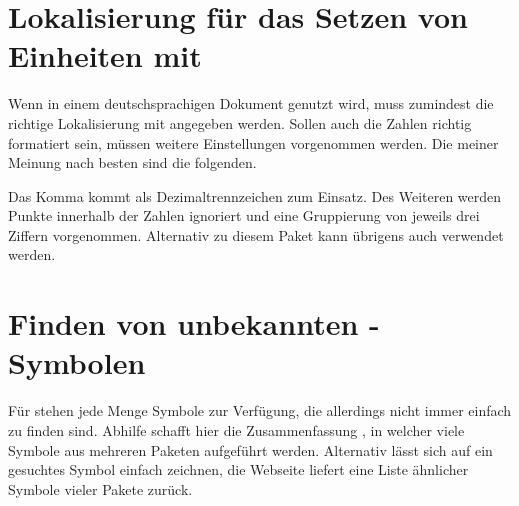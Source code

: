 \section{%
  Lokalisierung für das Setzen von Einheiten mit %
  \label{sec:tips:siunitx}%
}
%
Wenn  in einem deutschsprachigen Dokument genutzt wird, muss 
zumindest die richtige Lokalisierung mit  
angegeben werden. Sollen auch die Zahlen richtig formatiert sein, müssen 
weitere Einstellungen vorgenommen werden. Die meiner Meinung nach besten sind 
die folgenden.
%
\begin{quoting}
\begin{Code}
\end{Code}
\end{quoting}
%
Das Komma kommt als Dezimaltrennzeichen zum Einsatz. Des Weiteren werden Punkte 
innerhalb der Zahlen ignoriert und eine Gruppierung von jeweils drei Ziffern 
vorgenommen. Alternativ zu diesem Paket kann übrigens auch  
verwendet werden.



\section{%
  Finden von unbekannten -Symbolen%
}
%
Für  stehen jede Menge Symbole zur Verfügung, die allerdings 
nicht immer einfach zu finden sind. Abhilfe schafft hier die Zusammenfassung 
, in 
welcher viele Symbole aus mehreren Paketen aufgeführt werden. Alternativ lässt 
sich auf  ein 
gesuchtes Symbol einfach zeichnen, die Webseite liefert eine Liste ähnlicher 
Symbole vieler Pakete zurück.



